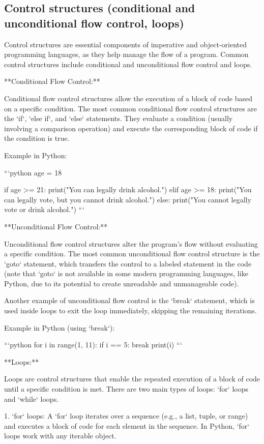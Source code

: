 \documentclass{article}
\begin{document}
\subsection{Control structures (conditional and unconditional flow control, loops)}

Control structures are essential components of imperative and object-oriented programming languages, as they help manage the flow of a program. Common control structures include conditional and unconditional flow control and loops.

**Conditional Flow Control:**

Conditional flow control structures allow the execution of a block of code based on a specific condition. The most common conditional flow control structures are the `if`, `else if`, and `else` statements. They evaluate a condition (usually involving a comparison operation) and execute the corresponding block of code if the condition is true.

Example in Python:

```python
age = 18

if age >= 21:
    print("You can legally drink alcohol.")
elif age >= 18:
    print("You can legally vote, but you cannot drink alcohol.")
else:
    print("You cannot legally vote or drink alcohol.")
```

**Unconditional Flow Control:**

Unconditional flow control structures alter the program's flow without evaluating a specific condition. The most common unconditional flow control structure is the `goto` statement, which transfers the control to a labeled statement in the code (note that `goto` is not available in some modern programming languages, like Python, due to its potential to create unreadable and unmanageable code).

Another example of unconditional flow control is the `break` statement, which is used inside loops to exit the loop immediately, skipping the remaining iterations.

Example in Python (using `break`):

```python
for i in range(1, 11):
    if i == 5:
        break
    print(i)
```

**Loops:**

Loops are control structures that enable the repeated execution of a block of code until a specific condition is met. There are two main types of loops: `for` loops and `while` loops.

1. `for` loops: A `for` loop iterates over a sequence (e.g., a list, tuple, or range) and executes a block of code for each element in the sequence. In Python, `for` loops work with any iterable object.
\end{document}
